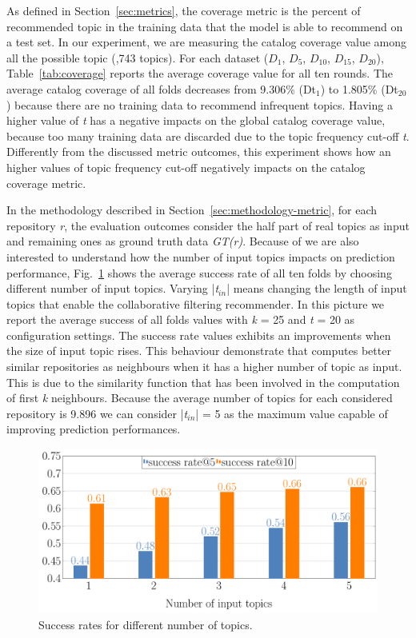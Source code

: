 As defined in Section~\ref{sec:metrics}, the coverage metric is the percent of recommended topic in the training data that the model is able to recommend on a test set. In our experiment, we are measuring the catalog coverage value among all the possible topic (,743 topics). For each dataset (\ie $D_{1}$, $D_{5}$, $D_{10}$, $D_{15}$, $D_{20}$),  Table~\ref{tab:coverage} reports the average coverage value for all ten rounds. 
The average catalog coverage of all folds decreases from 9.306\% (Dt$_1$) to 1.805\% (Dt$_{20}$) because there are no training data to recommend infrequent topics. 
Having a higher value of \emph{t} has a negative impacts on the global catalog coverage value, because too many training data are discarded due to the topic frequency cut-off \emph{t}. Differently from the discussed metric outcomes, this experiment shows how an higher values of topic frequency cut-off negatively impacts on the catalog coverage metric.

In the methodology described in Section~\ref{sec:methodology-metric}, for each repository \emph{r}, the evaluation outcomes consider the half part of real topics as input and remaining ones as ground truth data \emph{GT(r)}. Because of we are also interested to understand how the number of input topics impacts on prediction performance, Fig.~\ref{fig:pr-input-topics} shows the average success rate of all ten folds by choosing different number of input topics. Varying |\emph{t$_{in}$}| means changing the length of input topics that enable the \TF collaborative filtering recommender. In this picture we report the average success of all folds values with \emph{k} = 25 and \emph{t} = 20 as configuration settings. The success rate values exhibits an improvements when the size of input topic rises. This  behaviour demonstrate that \TF computes better similar repositories as neighbours when it has a higher number of topic as input. This is due to the similarity function that has been involved in the computation of first  \emph{k} neighbours. Because the average number of topics for each considered repository is 9.896 we can consider |\emph{t$_{in}$}| = 5 as the maximum value capable of improving prediction performances.
\begin{figure}[t!]
	\centering
	\includegraphics[width=0.8\linewidth]{figs/successRate_inputTopic.pdf}
	\caption{Success rates for different number of topics.}
	\label{fig:pr-input-topics}
\end{figure} 

